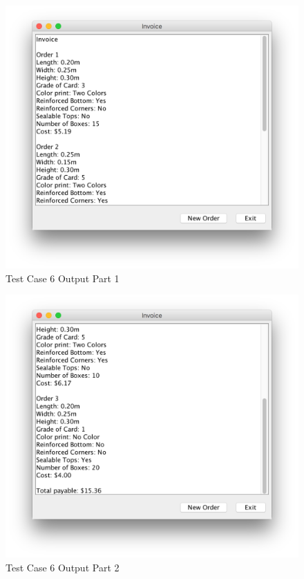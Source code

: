 \documentclass[12pt]{article}
\begin{document}
\begin{figure}[H]
	\includegraphics[width=\linewidth]{./screenshots/test_case_6_output_part1.png}
	\caption{Test Case 6 Output Part 1}
	\label{test_case_6_output}
\end{figure}
\begin{figure}[H]
	\includegraphics[width=\linewidth]{./screenshots/test_case_6_output_part2.png}
	\caption{Test Case 6 Output Part 2}
	\label{test_case_6_output}
\end{figure}
\newpage
\end{document}
